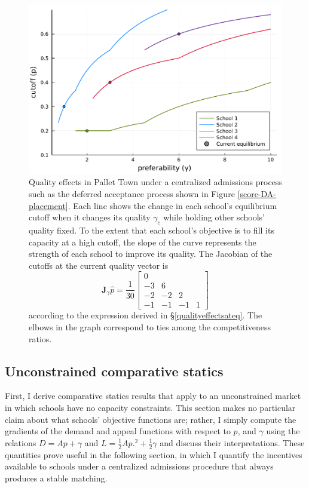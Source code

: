 \documentclass[12pt]{article}
\theoremstyle{definition}
\begin{document}
\begin{figure}
\begin{center}\includegraphics[width=\linewidth, ]{plots/vary-gamma-cutoff.pdf}\end{center}
\captionsetup{singlelinecheck=off}
    \caption[.]{Quality effects in Pallet Town under a centralized admissions process such as the deferred acceptance process shown in Figure \ref{score-DA-placement}. Each line shows the change in each school’s equilibrium cutoff when it changes its quality $\gamma_c$ while holding other schools’ quality fixed. To the extent that each school’s objective is to fill its capacity at a high cutoff, the slope of the curve represents the strength of each school to improve its quality. The Jacobian of the cutoffs at the current quality vector is
    \begin{equation*}
    \mathbf{J}_\gamma \hat p = \frac{1}{30}
    \begin{bmatrix}
      0 & & & \\
      -3 & 6 & & \\
      -2 & -2 & 2 & \\
      -1 & -1 & -1 & 1 
    \end{bmatrix}
    \end{equation*} 
according to the expression derived in \S\ref{qualityeffectsateq}. The elbows in the graph correspond to ties among the competitiveness ratios. 
    }
\label{vary-gamma-cutoff}
\end{figure}






\subsection{Unconstrained comparative statics}
First, I derive comparative statics results that apply to an unconstrained market in which schools have no capacity constraints. This section makes no particular claim about what schools' objective functions are; rather, I simply compute the gradients of the demand and appeal functions with respect to $p$, and $\gamma$ using the relations $D = Ap + \gamma$ and $L = \frac{1}{2} A p.^2 + \frac{1}{2}\gamma$ and discuss their interpretations. These quantities prove useful in the following section, in which I quantify the incentives available to schools under a centralized admissions procedure that always produces a stable matching. 
\end{document}
